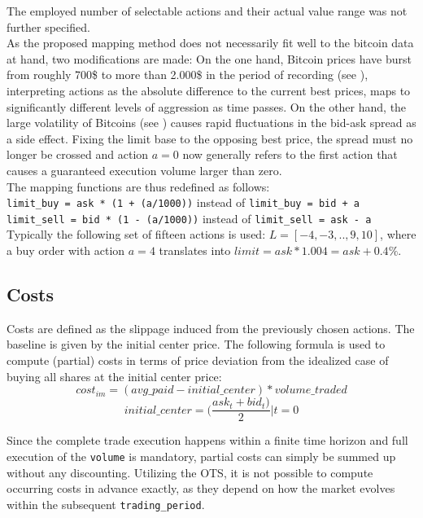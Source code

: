 The employed number of selectable actions and their actual value range was not further specified.\\

As the proposed mapping method does not necessarily fit well to the bitcoin data at hand, two modifications are made: On the one hand, Bitcoin prices have burst from roughly 700\$ to more than 2.000\$ in the period of recording (see ), \ie interpreting actions as the absolute difference to the current best prices, maps to significantly different levels of aggression as time passes. On the other hand, the large volatility of Bitcoins (see ) causes rapid fluctuations in the bid-ask spread as a side effect. Fixing the limit base to the opposing best price, the spread must no longer be crossed and action $a=0$ now generally refers to the first action that causes a guaranteed execution volume larger than zero.\\


The mapping functions are thus redefined as follows:\\
\lstinline!limit_buy = ask * (1 + (a/1000))! instead of \lstinline!limit_buy = bid + a!\\
\lstinline!limit_sell = bid * (1 - (a/1000))! instead of \lstinline!limit_sell = ask - a!\\

Typically the following set of fifteen actions is used: $L=[-4,-3,..,9,10]$, where \eg a buy order with action $a=4$ translates into $limit = ask * 1.004 = ask + 0.4\%$. 


\subsection{Costs}
\label{chap:costs}
Costs are defined as the slippage induced from the previously chosen actions. The baseline is given by the initial center price. The following formula is used to compute (partial) costs in terms of price deviation from the idealized case of buying all shares at the initial center price:
\begin{equation}
\label{eq:imcost}
   cost_{im} = (avg\_paid - initial\_center) * volume\_traded
\end{equation}
\begin{equation}
   initial\_center = (\dfrac{ask_t+bid_t)}{2} | t=0
\end{equation}

Since the complete trade execution happens within a finite time horizon and full execution of the \lstinline!volume! is mandatory, partial costs can simply be summed up without any discounting. Utilizing the \ac{OTS}, it is not possible to compute occurring costs in advance exactly, as they depend on how the market evolves within the subsequent \lstinline!trading_period!.\\


